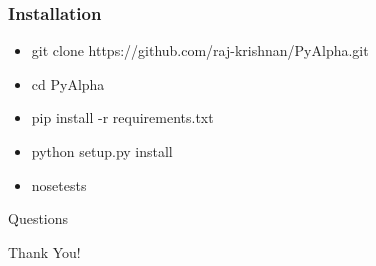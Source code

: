 \documentclass[serif,mathserif]{beamer}
\begin{document}
    \begin{frame}

        \frametitle{Installation}

        \begin{itemize}
            \item git clone https://github.com/raj-krishnan/PyAlpha.git
            \item cd PyAlpha
            \item pip install -r requirements.txt
            \item python setup.py install
            \item nosetests
        \end{itemize}

    \end{frame}





    \begin{frame}
        \centering \huge{Questions}
    \end{frame}

    \begin{frame}
        \centering \huge{Thank You!}
    \end{frame}
\end{document}
